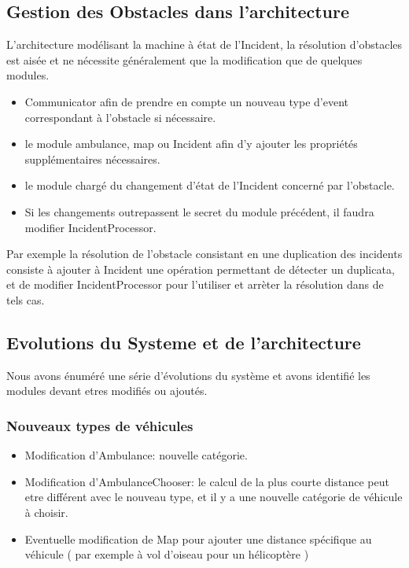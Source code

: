 \subsection{Gestion des Obstacles dans l'architecture}
	L'architecture modélisant la machine à état de l'Incident, 
	la résolution d'obstacles est aisée et ne nécessite généralement
	que la modification que de quelques modules.
	\begin{itemize}
		\item Communicator afin de prendre en compte un nouveau type
		 	d'event correspondant à l'obstacle si nécessaire.
		\item le module ambulance, map ou Incident afin d'y ajouter
			les propriétés supplémentaires nécessaires.
		\item le module chargé du changement d'état de l'Incident 
		      concerné par l'obstacle.
		\item Si les changements outrepassent le secret du module
			précédent, il faudra modifier IncidentProcessor.
	\end{itemize}
	
	Par exemple la résolution de l'obstacle consistant en une duplication
	des incidents consiste à ajouter à Incident une opération permettant
	de détecter un duplicata, et de modifier IncidentProcessor pour
	l'utiliser et arrèter la résolution dans de tels cas.

\subsection{Evolutions du Systeme et de l'architecture}
	Nous avons énuméré une série d'évolutions du système et avons
	identifié les modules devant etres modifiés ou ajoutés.
	\subsubsection{Nouveaux types de véhicules}
		\begin{itemize}
			\item Modification d'Ambulance: nouvelle catégorie.
			\item Modification d'AmbulanceChooser: le calcul de la plus courte
				distance peut etre différent avec le nouveau type, et il
				y a une nouvelle catégorie de véhicule à choisir.
			\item Eventuelle modification de Map pour ajouter une distance 
			      spécifique au véhicule ( par exemple à vol d'oiseau pour un
			      hélicoptère ) 
		\end{itemize}
